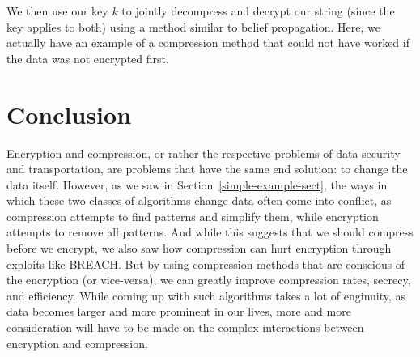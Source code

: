 \documentclass[11pt]{article}
\newcommand\genref{}
\newcommand\sectref{}
\def\genref#1#2{#1~\ref{#2}}
\def\sectref#1{\genref{Section}{#1}}
\begin{document}
We then use our key $k$ to jointly decompress and decrypt our string (since the key applies to both) 
using a method similar to belief propagation. 
Here, we actually have an example of a compression method that could not have worked 
if the data was not encrypted first. 

\section{Conclusion}\label{conclusion-sect}
Encryption and compression, or rather the respective problems of data security and transportation, 
are problems that have the same end solution: to change the data itself. However, as we saw in \sectref{simple-example-sect}, 
the ways in which these two classes of algorithms change data often come into conflict, 
as compression attempts to find patterns and simplify them, while encryption attempts to remove all patterns. 
And while this suggests that we should compress before we encrypt, we also saw how compression can 
hurt encryption through exploits like BREACH. But by using compression methods that are conscious of 
the encryption (or vice-versa)\cite{johnson, sangwan}, we can greatly improve compression rates, secrecy, and efficiency. 
While coming up with such algorithms takes a lot of enginuity, as data becomes larger and more prominent 
in our lives, more and more consideration will have to be made on the complex interactions between encryption and compression. 



% 
% 

\end{document}
